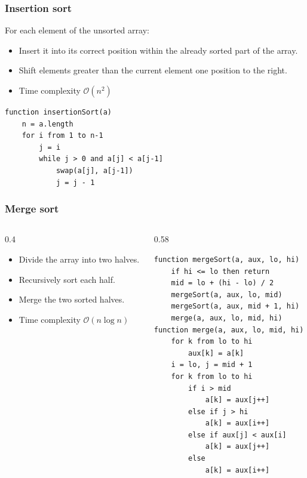 \documentclass[8pt,aspectratio=169]{beamer}
\begin{document}
\begin{frame}[fragile]
\frametitle{Insertion sort}
For each element of the unsorted array:
\begin{itemize}
    \item Insert it into its correct position within the already sorted part of the array.
    \item Shift elements greater than the current element one position to the right.
    \item Time complexity $\mathcal{O}(n^2)$
\end{itemize}
    \begin{lstlisting}[basicstyle=\tiny\ttfamily, frame=single]
function insertionSort(a)
    n = a.length
    for i from 1 to n-1
        j = i
        while j > 0 and a[j] < a[j-1]
            swap(a[j], a[j-1])
            j = j - 1
\end{lstlisting}
\end{frame}

\begin{frame}[fragile]
\frametitle{Merge sort}

\begin{columns}[T] %

    \begin{column}{0.4\textwidth}
        \begin{itemize}
            \item Divide the array into two halves.
            \item Recursively sort each half.
            \item Merge the two sorted halves.
            \item Time complexity $\mathcal{O}(n\log n)$
        \end{itemize}
    \end{column}

    \begin{column}{0.58\textwidth}
    \begin{lstlisting}[basicstyle=\tiny\ttfamily, frame=single]
function mergeSort(a, aux, lo, hi)
    if hi <= lo then return
    mid = lo + (hi - lo) / 2
    mergeSort(a, aux, lo, mid)
    mergeSort(a, aux, mid + 1, hi)
    merge(a, aux, lo, mid, hi)
function merge(a, aux, lo, mid, hi)
    for k from lo to hi
        aux[k] = a[k]
    i = lo, j = mid + 1
    for k from lo to hi
        if i > mid
            a[k] = aux[j++]
        else if j > hi
            a[k] = aux[i++]
        else if aux[j] < aux[i]
            a[k] = aux[j++]
        else
            a[k] = aux[i++]
    \end{lstlisting}
    \end{column}

\end{columns}

\end{frame}
\end{document}
